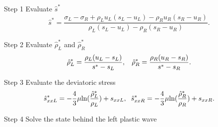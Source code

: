 \documentclass{article}
\numberwithin{equation}{section}
\numberwithin{table}{section}
\begin{document}
Step 1  Evaluate  $\hat{s}^*$
\begin{equation*}
  \hat{s}^* = \frac{\sigma_L-\sigma_R+\rho_L u_L(s_L-u_L)-\rho_R u_R(s_R-u_R)}{\rho_L(s_L-u_L)-\rho_R(s_R-u_R)}.
\end{equation*}

Step 2  Evaluate  $\hat{\rho}_L^*$ and $\hat{\rho}_R^*$
\begin{equation*}
  \hat{\rho}_L^* = \frac{\rho_L(u_L-s_L)}{s^*-s_L}, \hspace{0.3cm}  \hat{\rho}_R^* = \frac{\rho_R(u_R-s_R)}{s^*-s_R}.
\end{equation*}

Step 3  Evaluate  the deviatoric stress
\begin{equation*}
  \hat{s}_{xxL}^*=-\frac{4}{3}\mu\text{ln}(\frac{\hat{\rho}_L^*}{\rho_L})+s_{xxL},\hspace{0.2cm}  \hat{s}_{xxR}^*=-\frac{4}{3}\mu\text{ln}(\frac{\hat{\rho}_R^*}{\rho_R})+s_{xxR}.
\end{equation*}

Step 4 Solve the state behind the left  plastic wave
\end{document}
